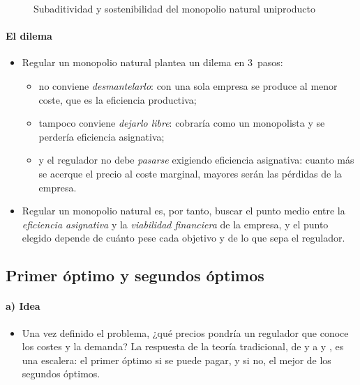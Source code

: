 \documentclass[11pt]{article}
\begin{document}
\begin{figure}[H]
\centering
\caption{Subaditividad y sostenibilidad del monopolio natural uniproducto}\label{fig:subaditividad}
\end{figure}

\paragraph{El dilema}

\begin{itemize}
\item Regular un monopolio natural plantea un dilema en 3~pasos:
  \begin{itemize}
  \item no conviene \emph{desmantelarlo}: con una sola empresa se produce al menor coste, que es la eficiencia productiva;
  \item tampoco conviene \emph{dejarlo libre}: cobraría como un monopolista y se perdería eficiencia asignativa;
  \item y el regulador no debe \emph{pasarse} exigiendo eficiencia asignativa: cuanto más se acerque el precio al coste marginal, mayores serán las pérdidas de la empresa.
  \end{itemize}
\item Regular un monopolio natural es, por tanto, buscar el punto medio entre la \emph{eficiencia asignativa} y la \emph{viabilidad financiera} de la empresa, y el punto elegido depende de cuánto pese cada objetivo y de lo que sepa el regulador.
\end{itemize}

\subsection{Primer óptimo y segundos óptimos}\label{sec:regulacion-informacion-completa}

\paragraph{a) Idea}

\begin{itemize}
\item Una vez definido el problema, ¿qué precios pondría un regulador que conoce los costes y la demanda? La respuesta de la teoría tradicional, de \textcite{Dupuit1844Mesure} y \textcite{Hotelling1938General} a \textcite{Coase1946Marginal} y \textcite{Boiteux1956Gestion}, es una escalera: el primer óptimo si se puede pagar, y si no, el mejor de los segundos óptimos.
\end{itemize}
\end{document}
